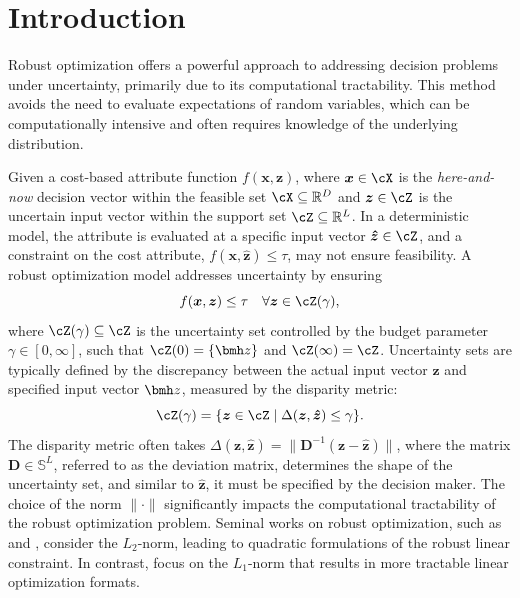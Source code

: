 \documentclass[mnsc, nonblindrev]{informswp}
\newcommand{\1}[1]{\mathds{1}{\left(#1\right)}}
\begin{document}

\maketitle

\section{Introduction}

Robust optimization offers a powerful approach to addressing decision problems under uncertainty, primarily due to its computational tractability. This method avoids the need to evaluate expectations of random variables, which can be computationally intensive and often requires knowledge of the underlying distribution.

Given a cost-based attribute function \( f(\bm x, \bm z) \), where \( \bm x \in \cX \) is the \emph{here-and-now} decision vector within the feasible set \( \cX \subseteq \mathbb{R}^D \) and \( \bm z \in \cZ \) is the uncertain input vector within the support set \( \cZ \subseteq \mathbb{R}^L \). In a deterministic model, the attribute is evaluated at a specific input vector \( \bm{\hat{z}} \in \cZ \), and a constraint on the cost attribute, \( f(\bm x, \bm{\hat{z}}) \leq \tau \), may not ensure feasibility. A robust optimization model addresses uncertainty by ensuring
\[ 
f(\bm x, \bm z) \leq \tau \quad \forall \bm z \in \cZ(\gamma), 
\]
where \( \cZ(\gamma) \subseteq \cZ \) is the uncertainty set controlled by the budget parameter \( \gamma \in [0, \infty] \), such that \( \cZ(0) = \{\bmh z\} \) and \( \cZ(\infty) = \cZ \). Uncertainty sets are typically defined by the discrepancy between the actual input vector $\bm z$ and specified input vector $\bmh z$, measured by the disparity metric:
$$
\cZ(\gamma) = \{ \bm z \in \cZ \;|\; \Delta(\bm z, \bm{\hat{z}}) \leq \gamma \}.
$$
The disparity metric often takes $\Delta(\bm z, \bm{\hat{z}}) = \|\mathbf{D}^{-1}(\bm z - \bm{\hat{z}})\|$, where the matrix \( \mathbf{D} \in \mathbb{S}^L \), referred to as the deviation matrix, determines the shape of the uncertainty set, and similar to \( \bm{\hat{z}} \), it must be specified by the decision maker. The choice of the norm \( \|\cdot\| \) significantly impacts the computational tractability of the robust optimization problem. Seminal works on robust optimization, such as \cite{ben1998robust} and \cite{el1998robust}, consider the \( L_2 \)-norm, leading to quadratic formulations of the robust linear constraint. In contrast, \cite{bertsimas2004price} focus on the \( L_1 \)-norm that results in more tractable linear optimization formats.
\end{document}
